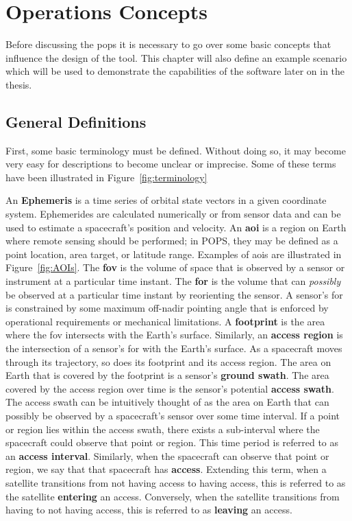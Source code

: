 \glsresetall{} 
\chapter{Operations Concepts}\label{chap:ops}

\lettrine[lines=2, findent=0pt, nindent=5pt]{B}{}efore discussing the
\gls{pops} it is necessary to go over some basic concepts that influence the
design of the tool. This chapter will also define an example scenario which
will be used to demonstrate the capabilities of the software later on in the
thesis.

\section{General Definitions}

First, some basic terminology must be defined.  Without doing so, it may become
very easy for descriptions to become unclear or imprecise. Some of these terms
have been illustrated in Figure~\ref{fig:terminology}

An \textbf{Ephemeris} is a time series of orbital state vectors in a given
coordinate system. Ephemerides are calculated numerically or from sensor data
and can be used to estimate a spacecraft’s position and velocity.  An
\textbf{\gls{aoi}} is a region on Earth where remote sensing should be
performed; in POPS, they may be defined as a point location, area target, or
latitude range.  Examples of \glspl{aoi} are illustrated in
Figure~\ref{fig:AOIs}. The \textbf{\gls{fov}} is the volume of space that is
observed by a sensor or instrument at a particular time instant.  The
\textbf{\gls{for}} is the volume that can \textit{possibly} be observed at a
particular time instant by reorienting the sensor. A sensor’s \gls{for} is
constrained by some maximum off-nadir pointing angle that is enforced by
operational requirements or mechanical limitations. A \textbf{footprint} is the
area where the \gls{fov} intersects with the Earth’s surface.  Similarly, an
\textbf{access region} is the intersection of a sensor’s \gls{for} with the
Earth’s surface.  As a spacecraft moves through its trajectory, so does its
footprint and its access region.  The area on Earth that is covered by the
footprint is a sensor’s \textbf{ground swath}. The area covered by the access
region over time is the sensor’s potential \textbf{access swath}.  The access
swath can be intuitively thought of as the area on Earth that can possibly be
observed by a spacecraft’s sensor over some time interval.  If a point or
region lies within the access swath, there exists a sub-interval where the
spacecraft could observe that point or region. This time period is referred to
as an \textbf{access interval}. Similarly, when the spacecraft can observe that
point or region, we say that that spacecraft has \textbf{access}.  Extending
this term, when a satellite transitions from not having access to having
access, this is referred to as the satellite \textbf{entering} an access.
Conversely, when the satellite transitions from having to not having access,
this is referred to as \textbf{leaving} an access. 

